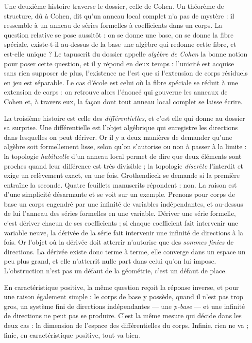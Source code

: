 \documentclass[11pt,a4paper]{article}
\begin{document}
\begin{resume}
Une deuxième histoire traverse le dossier, celle de Cohen. Un théorème de
structure, dû à Cohen, dit qu'un anneau local complet n'a pas de mystère : il
ressemble à un anneau de séries formelles à coefficients dans un corps. La
question relative se pose aussitôt : on se donne une base, on se donne la fibre
spéciale, existe-t-il au-dessus de la base une algèbre qui redonne cette fibre,
et est-elle unique ? Le tapuscrit du dossier appelle \emph{algèbre de Cohen} la
bonne notion pour poser cette question, et il y répond en deux temps :
l'unicité est acquise sans rien supposer de plus, l'existence ne l'est que si
l'extension de corps résiduels en jeu est séparable. Le cas d'école est celui
où la fibre spéciale se réduit à une extension de corps : on retrouve alors
l'énoncé qui gouverne les anneaux de Cohen et, à travers eux, la façon dont
tout anneau local complet se laisse écrire.

La troisième histoire est celle des \emph{différentielles}, et c'est elle qui
donne au dossier sa surprise. Une différentielle est l'objet algébrique qui
enregistre les directions dans lesquelles on peut dériver. Or il y a deux
manières de demander qu'une algèbre soit formellement lisse, selon qu'on
s'autorise ou non à passer à la limite : la topologie \emph{habituelle}
d'un anneau local permet de dire que deux éléments sont proches quand leur
différence est très divisible ; la topologie \emph{discrète} l'interdit et
exige un relèvement exact, en une fois. Grothendieck se demande si la première
entraîne la seconde. Quatre feuillets manuscrits répondent : non. La raison est
d'une simplicité désarmante et se voit sur un exemple. Prenons pour corps de
base un corps engendré par une infinité de variables indépendantes, et
au-dessus de lui l'anneau des séries formelles en une variable. Dériver une
série formelle, c'est dériver chacun de ses coefficients ; si chaque
coefficient fait intervenir une variable neuve, la dérivée de la série fait
intervenir une infinité de directions à la fois. Or l'objet où la dérivée doit
atterrir n'autorise que des \emph{sommes finies} de directions. La dérivée
existe donc terme à terme, elle converge dans un espace un peu plus grand, et
elle n'atterrit nulle part dans celui qu'on lui impose. L'obstruction n'est pas
un défaut de la géométrie, c'est un défaut de place.

En caractéristique positive, la même question reçoit la réponse inverse, et
pour une raison également simple : le corps de base y possède, quand il n'est
pas trop gros, un système fini de directions indépendantes — une
\emph{p-base} — et une infinité de directions ne peut pas se produire. C'est
la même mesure qui décide dans les deux cas : la dimension de l'espace des
différentielles du corps. Infinie, rien ne va ; finie, en caractéristique
positive, tout va bien.


\end{resume}
\end{document}
